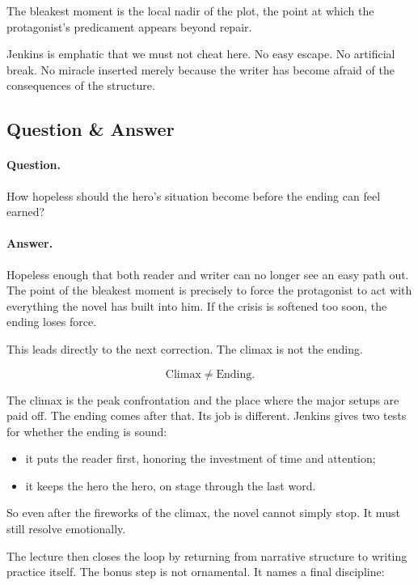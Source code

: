\begin{definition}
The bleakest moment is the local nadir of the plot, the point at which the protagonist's predicament appears beyond repair.
\end{definition}

Jenkins is emphatic that we must not cheat here. No easy escape. No artificial break. No miracle inserted merely because the writer has become afraid of the consequences of the structure.

\subsection{Question \& Answer}

\paragraph{Question.} How hopeless should the hero's situation become before the ending can feel earned?

\paragraph{Answer.} Hopeless enough that both reader and writer can no longer see an easy path out. The point of the bleakest moment is precisely to force the protagonist to act with everything the novel has built into him. If the crisis is softened too soon, the ending loses force.

This leads directly to the next correction. The climax is not the ending.

\begin{equation}
\text{Climax} \neq \text{Ending}.
\end{equation}

The climax is the peak confrontation and the place where the major setups are paid off. The ending comes after that. Its job is different. Jenkins gives two tests for whether the ending is sound:

\begin{itemize}
\item it puts the reader first, honoring the investment of time and attention;
\item it keeps the hero the hero, on stage through the last word.
\end{itemize}

So even after the fireworks of the climax, the novel cannot simply stop. It must still resolve emotionally.

The lecture then closes the loop by returning from narrative structure to writing practice itself. The bonus step is not ornamental. It names a final discipline:

